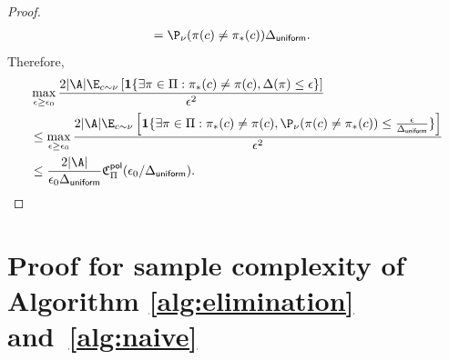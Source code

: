 \documentclass{article}
\newcommand{\1}{\mathbf{1}}
\begin{document}
\begin{proof}
\begin{align*}
    &= \P_\nu(\pi(c)\ne\pi_*(c))\Delta_{\mathsf{uniform}}.
\end{align*}
Therefore,
\begin{align*}
    &\max_{\epsilon\geq \epsilon_0}\frac{ 2|\A|\E_{c \sim \nu} \left[  \1\{\exists\pi\in\Pi:\pi_*(c) \neq \pi(c),\Delta(\pi)\leq\epsilon \} \right] }{\epsilon^2}\\
    &\leq \max_{\epsilon\geq \epsilon_0}\frac{ 2|\A|\E_{c \sim \nu} \left[  \1\{\exists\pi\in\Pi:\pi_*(c) \neq \pi(c),\P_\nu(\pi(c)\ne\pi_*(c))\leq\frac{\epsilon}{\Delta_{\mathsf{uniform}}} \} \right] }{\epsilon^2}\\
    &\leq \frac{2|\A|}{\epsilon_0\Delta_{\mathsf{uniform}}}\mathfrak{C}_{\Pi}^{\mathsf{pol}}(\epsilon_0/\Delta_{\mathsf{uniform}}).
\end{align*}
\end{proof}

\section{Proof for sample complexity of Algorithm \ref{alg:elimination} and~\ref{alg:naive}}\label{sec:proof_rage_correctness}
\end{document}
